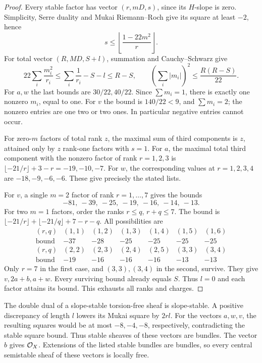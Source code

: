 \begin{proof}
Every stable factor has vector \((r,mD,s)\), since its \(H\)-slope
is zero. Simplicity, Serre duality and Mukai Riemann--Roch give
its square at least \(-2\), hence
\[
 s\le\left\lfloor\frac{1-22m^2}{r}\right\rfloor.
\]
For total vector \((R,MD,S+l)\), summation and Cauchy--Schwarz give
\begin{equation}\label{eq:rank-bound}
 22\sum_i\frac{m_i^2}{r_i}\le
 \sum_i\frac1{r_i}-S-l\le R-S,\qquad
 \left(\sum_i|m_i|\right)^2\le\frac{R(R-S)}{22}.
\end{equation}
For \(a,w\) the last bounds are \(30/22,40/22\).
Since \(\sum m_i=1\), there is exactly one nonzero \(m_i\), equal
to one. For \(v\) the bound is \(140/22<9\), and
\(\sum m_i=2\); the nonzero entries are one two or two ones.
In particular negative entries cannot occur.

For zero-\(m\) factors of total rank \(z\), the maximal sum of
third components is \(z\), attained only by \(z\) rank-one factors
with \(s=1\). For \(a\), the maximal total third component with
the nonzero factor of rank \(r=1,2,3\) is
\(\lfloor-21/r\rfloor+3-r=-19,-10,-7\).
For \(w\), the corresponding values at \(r=1,2,3,4\) are
\(-18,-9,-6,-6\). These give precisely the stated lists.

For \(v\), a single \(m=2\) factor of rank \(r=1,\ldots,7\)
gives the bounds
\[
 -81,\ -39,\ -25,\ -19,\ -16,\ -14,\ -13.
\]
For two \(m=1\) factors, order the ranks \(r\le q\), \(r+q\le7\).
The bound is
\(\lfloor-21/r\rfloor+\lfloor-21/q\rfloor+7-r-q\).
All possibilities are
\[
\begin{array}{c|rrrrrr}
(r,q)&(1,1)&(1,2)&(1,3)&(1,4)&(1,5)&(1,6)\\ \hline
\text{bound}&-37&-28&-25&-25&-25&-25\\[2pt]
(r,q)&(2,2)&(2,3)&(2,4)&(2,5)&(3,3)&(3,4)\\ \hline
\text{bound}&-19&-16&-16&-16&-13&-13
\end{array}
\]
Only \(r=7\) in the first case, and \((3,3),(3,4)\) in the
second, survive. They give \(v,2a+b,a+w\).
Every surviving bound already equals \(S\). Thus \(l=0\) and
each factor attains its bound. This exhausts all ranks and charges.
\end{proof}

The double dual of a slope-stable torsion-free sheaf is slope-stable.
A positive discrepancy of length \(l\) lowers its Mukai square by
\(2rl\). For the vectors \(a,w,v\), the resulting squares would
be at most \(-8,-4,-8\), respectively, contradicting the stable
square bound. Thus stable sheaves of these vectors are bundles.
The vector \(b\) gives \(\mathcal O_X\). Extensions of the listed stable
bundles are bundles, so every central semistable sheaf of these
vectors is locally free.

